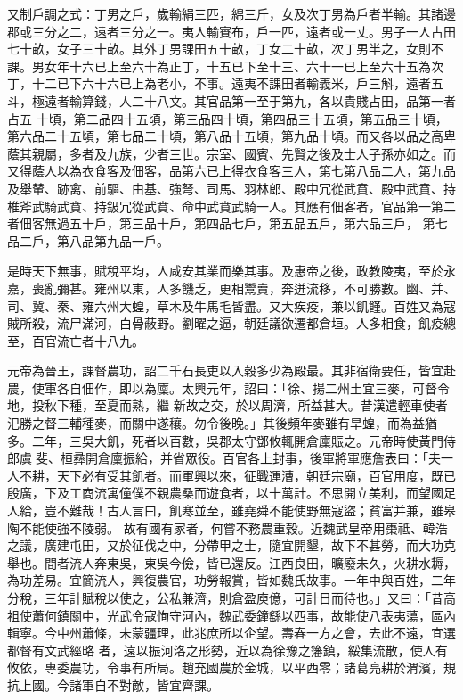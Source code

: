 \begin{pinyinscope}
 又制戶調之式：丁男之戶，歲輸絹三匹，綿三斤，女及次丁男為戶者半輸。其諸邊郡或三分之二，遠者三分之一。夷人輸賨布，戶一匹，遠者或一丈。男子一人占田七十畝，女子三十畝。其外丁男課田五十畝，丁女二十畝，次丁男半之，女則不課。男女年十六已上至六十為正丁，十五已下至十三、六十一已上至六十五為次丁，十二已下六十六已上為老小，不事。遠夷不課田者輸義米，戶三斛，遠者五斗，極遠者輸算錢，人二十八文。其官品第一至于第九，各以貴賤占田，品第一者占五
 十頃，第二品四十五頃，第三品四十頃，第四品三十五頃，第五品三十頃，第六品二十五頃，第七品二十頃，第八品十五頃，第九品十頃。而又各以品之高卑蔭其親屬，多者及九族，少者三世。宗室、國賓、先賢之後及士人子孫亦如之。而又得蔭人以為衣食客及佃客，品第六已上得衣食客三人，第七第八品二人，第九品及舉輦、跡禽、前驅、由基、強弩、司馬、羽林郎、殿中冗從武賁、殿中武賁、持椎斧武騎武賁、持鈒冗從武賁、命中武賁武騎一人。其應有佃客者，官品第一第二者佃客無過五十戶，第三品十戶，第四品七戶，第五品五戶，第六品三戶，
 第七品二戶，第八品第九品一戶。



 是時天下無事，賦稅平均，人咸安其業而樂其事。及惠帝之後，政教陵夷，至於永嘉，喪亂彌甚。雍州以東，人多饑乏，更相鬻賣，奔迸流移，不可勝數。幽、并、司、冀、秦、雍六州大蝗，草木及牛馬毛皆盡。又大疾疫，兼以飢饉。百姓又為寇賊所殺，流尸滿河，白骨蔽野。劉曜之逼，朝廷議欲遷都倉垣。人多相食，飢疫總至，百官流亡者十八九。



 元帝為晉王，課督農功，詔二千石長吏以入穀多少為殿最。其非宿衛要任，皆宜赴農，使軍各自佃作，即以為廩。太興元年，詔曰：「徐、揚二州土宜三麥，可督令地，投秋下種，至夏而熟，繼
 新故之交，於以周濟，所益甚大。昔漢遣輕車使者氾勝之督三輔種麥，而關中遂穰。勿令後晚。」其後頻年麥雖有旱蝗，而為益猶多。二年，三吳大飢，死者以百數，吳郡太守鄧攸輒開倉廩賑之。元帝時使黃門侍郎虞斐、桓彞開倉廩振給，并省眾役。百官各上封事，後軍將軍應詹表曰：「夫一人不耕，天下必有受其飢者。而軍興以來，征戰運漕，朝廷宗廟，百官用度，既已殷廣，下及工商流寓僮僕不親農桑而遊食者，以十萬計。不思開立美利，而望國足人給，豈不難哉！古人言曰，飢寒並至，雖堯舜不能使野無寇盜；貧富并兼，雖皋陶不能使強不陵弱。
 故有國有家者，何嘗不務農重穀。近魏武皇帝用棗祗、韓浩之議，廣建屯田，又於征伐之中，分帶甲之士，隨宜開墾，故下不甚勞，而大功克舉也。間者流人奔東吳，東吳今儉，皆已還反。江西良田，曠廢未久，火耕水耨，為功差易。宜簡流人，興復農官，功勞報賞，皆如魏氏故事。一年中與百姓，二年分稅，三年計賦稅以使之，公私兼濟，則倉盈庾億，可計日而待也。」又曰：「昔高祖使蕭何鎮關中，光武令寇恂守河內，魏武委鐘繇以西事，故能使八表夷蕩，區內輯寧。今中州蕭條，未蒙疆理，此兆庶所以企望。壽春一方之會，去此不遠，宜選都督有文武經略
 者，遠以振河洛之形勢，近以為徐豫之籓鎮，綏集流散，使人有攸依，專委農功，令事有所局。趙充國農於金城，以平西零；諸葛亮耕於渭濱，規抗上國。今諸軍自不對敵，皆宜齊課。




\end{pinyinscope}
